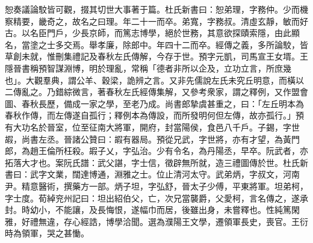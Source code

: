 \begin{pinyinscope}
恕奏議論駮皆可觀，掇其切世大事著于篇。杜氏新書曰：恕弟理，字務仲。少而機察精要，畿奇之，故名之曰理。年二十一而卒。弟寬，字務叔。清虛玄靜，敏而好古。以名臣門戶，少長京師，而篤志博學，絕於世務，其意欲探賾索隱，由此顯名，當塗之士多交焉。舉孝廉，除郎中。年四十二而卒。經傳之義，多所論駮，皆草創未就，惟刪集禮記及春秋左氏傳解，今存于世。預字元凱，司馬宣王女壻。王隱晉書稱預智謀淵博，明於理亂，常稱「德者非所以企及，立功立言，所庶幾也」。大觀羣典，謂公羊、穀梁，詭辨之言。又非先儒說左氏未究丘明意，而橫以二傳亂之。乃錯綜微言，著春秋左氏經傳集解，又參考衆家，謂之釋例，又作盟會圖、春秋長歷，備成一家之學，至老乃成。尚書郎摯虞甚重之，曰：「左丘明本為春秋作傳，而左傳遂自孤行；釋例本為傳設，而所發明何但左傳，故亦孤行。」預有大功名於晉室，位至征南大將軍，開府，封當陽侯，食邑八千戶。子錫，字世嘏，尚書左丞。晉諸公贊曰：嘏有器局。預從兄武，字世將，亦有才望，為黃門郎，為趙王倫所枉殺。嘏子乂，字弘治。少有令名，為丹陽丞，早卒。阮武者，亦拓落大才也。案阮氏譜：武父諶，字士信，徵辟無所就，造三禮圖傳於世。杜氏新書曰：武字文業，闊達博通，淵雅之士。位止清河太守。武弟炳，字叔文，河南尹。精意醫術，撰藥方一部。炳子坦，字弘舒，晉太子少傅，平東將軍。坦弟柯，字士度。荀綽兖州記曰：坦出紹伯父，亡，次兄當襲爵，父愛柯，言名傳之，遂承封。時幼小，不能讓，及長悔恨，遂幅巾而居，後雖出身，未嘗釋也。性純篤閑雅，好禮無違，存心經誥，博學洽聞。選為濮陽王文學，遷領軍長史，喪官。王衍時為領軍，哭之甚慟。


\end{pinyinscope}